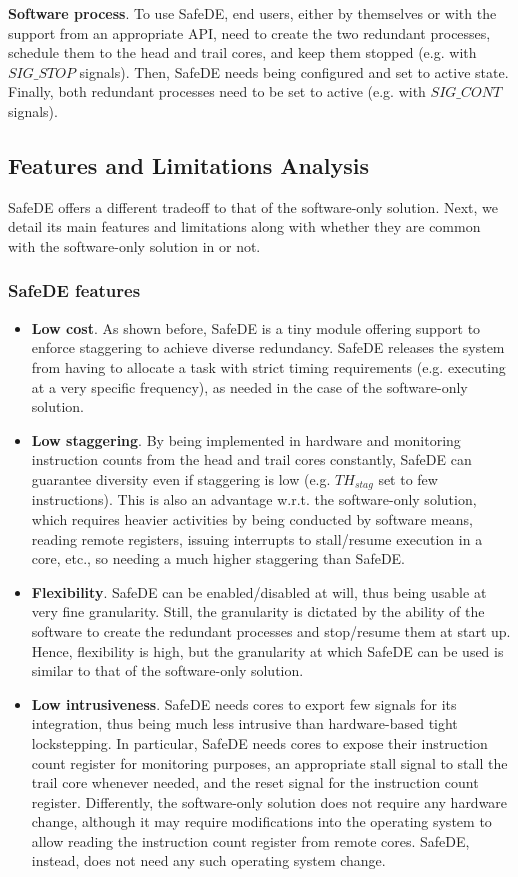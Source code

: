 \textbf{Software process}. To use SafeDE, end users, either by themselves or with the support from an appropriate API, need to create the two redundant processes, schedule them to the head and trail cores, and keep them stopped (e.g. with $SIG\_STOP$ signals). Then, SafeDE needs being configured and set to active state. Finally, both redundant processes need to be set to active (e.g. with $SIG\_CONT$ signals).


\subsection{Features and Limitations Analysis}

SafeDE offers a different tradeoff to that of the software-only solution. Next, we detail its main features and limitations along with whether they are common with the software-only solution in \cite{SergiDFT} or not.

\subsubsection{SafeDE features}
\begin{itemize}
\item \textbf{Low cost}. As shown before, SafeDE is a tiny module offering support to enforce staggering to achieve diverse redundancy. SafeDE releases the system from having to allocate a task with strict timing requirements (e.g. executing at a very specific frequency), as needed in the case of the software-only solution. 
\item \textbf{Low staggering}. By being implemented in hardware and monitoring instruction counts from the head and trail cores constantly, SafeDE can guarantee diversity even if staggering is low (e.g. $TH_{stag}$ set to few instructions). This is also an advantage w.r.t. the software-only solution, which requires heavier activities by being conducted by software means, reading remote registers, issuing interrupts to stall/resume execution in a core, etc., so needing a much higher staggering than SafeDE.
\item \textbf{Flexibility}. SafeDE can be enabled/disabled at will, thus being usable at very fine granularity. Still, the granularity is dictated by the ability of the software to create the redundant processes and stop/resume them at start up. Hence, flexibility is high, but the granularity at which SafeDE can be used is similar to that of the software-only solution.
\item \textbf{Low intrusiveness}. SafeDE needs cores to export few signals for its integration, thus being much less intrusive than hardware-based tight lockstepping. In particular, SafeDE needs cores to expose their instruction count register for monitoring purposes, an appropriate stall signal to stall the trail core whenever needed, and the reset signal for the instruction count register. 
Differently, the software-only solution does not require any hardware change, although it may require modifications into the operating system to allow reading the instruction count register from remote cores. SafeDE, instead, does not need any such operating system change.
\end{itemize}

